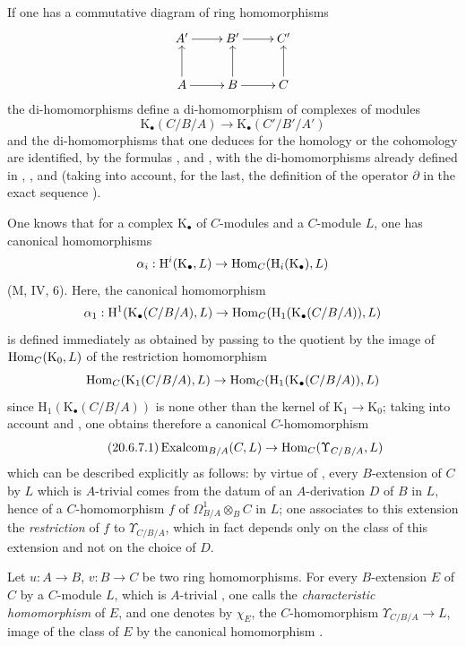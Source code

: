 If one has a commutative diagram of ring homomorphisms
\[
\xymatrix{
  A' \ar[r] & B' \ar[r] & C' \\
  A \ar[u] \ar[r] & B \ar[u] \ar[r] & C \ar[u]
}
\]
the di-homomorphisms  define a di-homomorphism of complexes of modules
\begin{equation}
\tag{20.6.6.4}
  \label{0.20.6.6.4}
  \mathrm{K}_\bullet(C/B/A)\to\mathrm{K}_\bullet(C'/B'/A')
\end{equation}
and the di-homomorphisms that one deduces for the homology or the cohomology are identified, by the formulas ,  and , with the di-homomorphisms already defined in , ,  and  (taking into account, for the last, the definition of the operator $\partial$ in the exact sequence ).

\begin{env}[20.6.7]
\label{0.20.6.7}
One knows that for a complex $\mathrm{K}_\bullet$ of $C$-modules and a $C$-module $L$, one has canonical homomorphisms
\[
  \alpha_i:\mathrm{H}^i(\mathrm{K}_\bullet,L)\to\operatorname{Hom}_C(\mathrm{H}_i(\mathrm{K}_\bullet),L)
\]
(M, IV, 6).
Here, the canonical homomorphism
\[
  \alpha_1:\mathrm{H}^1(\mathrm{K}_\bullet(C/B/A),L)\to\operatorname{Hom}_C(\mathrm{H}_1(\mathrm{K}_\bullet(C/B/A)),L)
\]
is defined immediately as obtained by passing to the quotient by the image of $\operatorname{Hom}_C(\mathrm{K}_0,L)$ of the restriction homomorphism
\[
  \operatorname{Hom}_C(\mathrm{K}_1(C/B/A),L)\to\operatorname{Hom}_C(\mathrm{H}_1(\mathrm{K}_\bullet(C/B/A)),L)
\]
since $\mathrm{H}_1(\mathrm{K}_\bullet(C/B/A))$ is none other than the kernel of $\mathrm{K}_1\to\mathrm{K}_0$; taking into account  and , one obtains therefore a canonical $C$-homomorphism
\begin{equation}
\tag{20.6.7.1}
  \label{0.20.6.7.1}
  \operatorname{Exalcom}_{B/A}(C,L)\to\operatorname{Hom}_C(\Upsilon_{C/B/A},L)
\end{equation}
which can be described explicitly as follows: by virtue of , every $B$-extension of $C$ by $L$ which is $A$-trivial comes from the datum of an $A$-derivation $D$ of $B$ in $L$, hence  of a $C$-homomorphism $f$ of $\Omega^1_{B/A}\otimes_B C$ in $L$; one associates to this extension the \emph{restriction} of $f$ to $\Upsilon_{C/B/A}$, which in fact depends only on the class of this extension and not on the choice of $D$.
\end{env}

\begin{definition}[20.6.8]
\label{0.20.6.8}
Let $u:A\to B$, $v:B\to C$ be two ring homomorphisms.
For every $B$-extension $E$ of $C$ by a $C$-module $L$, which is $A$-trivial , one calls the \emph{characteristic homomorphism} of $E$, and one denotes by $\chi_E$, the $C$-homomorphism $\Upsilon_{C/B/A}\to L$, image of the class of $E$ by the canonical homomorphism .
\end{definition}

